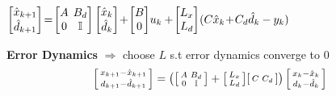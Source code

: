 $
	\begin{bmatrix}
		\hat{x}_{k+1} \\
		\hat{d}_{k+1}
	\end{bmatrix}
	\!=\!
	\begin{bmatrix}
		A & \hspace{-2mm} B_d       \\
		0 & \hspace{-2mm}\mathbb{I}
	\end{bmatrix}
	\begin{bmatrix}
		\hat{x}_{k} \\
		\hat{d}_{k}
	\end{bmatrix}
	\!+\!
	\begin{bmatrix}
		B \\
		0
	\end{bmatrix}
	\!u_{k}
	+
	\hspace{-.5mm}
	\begin{bmatrix}
		L_x \\
		L_d
	\end{bmatrix}
	\hspace{-.5mm}
	(C\hat{x}_{k} \!+\! C_d \hat{d}_{k}-y_{k})
$

\textbf{Error Dynamics} $\Rightarrow$
choose $L$ s.t error dynamics converge to $0$
\begin{align*}
	\begin{bsmallmatrix}
		x_{k+1} - \hat{x}_{k+1} \\
		d_{k+1} - \hat{d}_{k+1}
	\end{bsmallmatrix}
	= \left(
	\begin{bsmallmatrix}
		A & B_d        \\
		0 & \mathbb{I}
	\end{bsmallmatrix}
	+
	\begin{bsmallmatrix}
		L_x \\
		L_d
	\end{bsmallmatrix}
	\begin{bsmallmatrix}
		C & C_d
	\end{bsmallmatrix}
	\right)
	\begin{bsmallmatrix}
		x_{k} - \hat{x}_{k} \\
		d_{k} - \hat{d}_{k}
	\end{bsmallmatrix}
\end{align*}

